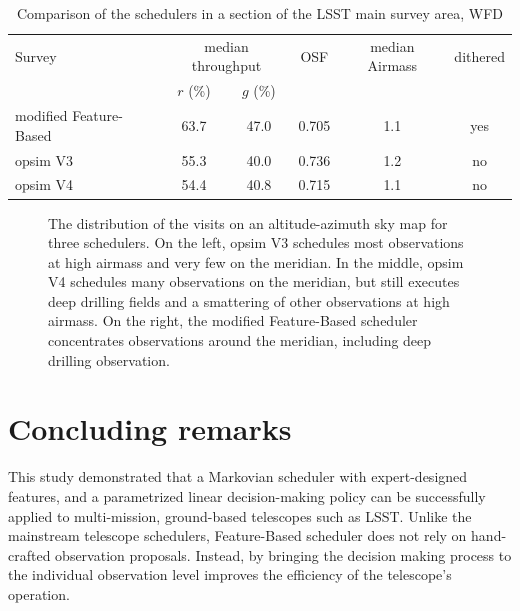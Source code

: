 \documentclass[12pt]{aastex62}
\theoremstyle{definition}
\begin{document}
\begin{table}
\caption{Comparison of the schedulers in a section of the LSST main survey area, WFD}\label{OSF_table}
\begin{center}
\begin{tabular}{l|ccccc} \hline
Survey &\multicolumn{2}{c}{median throughput} & OSF & median Airmass & dithered\\
&$r$ (\%) &  $g$ (\%) &&&\\ \hline
modified Feature-Based & 63.7 & 47.0& 0.705 & 1.1 & yes  \\
opsim V3      & 55.3 & 40.0 & 0.736 & 1.2 & no  \\
opsim V4      & 54.4 & 40.8 & 0.715 & 1.1 & no \\ \hline
\end{tabular}
\end{center}
\end{table}



\begin{figure}
\caption{The distribution of the visits on an altitude-azimuth sky map for three schedulers. On the left, opsim V3 schedules most observations at high airmass and very few on the meridian. In the middle, opsim V4 schedules many observations on the meridian, but still executes deep drilling fields and a smattering of other observations at high airmass. On the right, the modified Feature-Based scheduler concentrates observations around the meridian, including deep drilling observation. }\label{fig_all_alt_az}
\end{figure}

\section{Concluding remarks}\label{sec_conclusion}

This study demonstrated that a Markovian scheduler with expert-designed features, and a parametrized linear decision-making policy can be successfully applied to multi-mission, ground-based telescopes such as LSST. Unlike the mainstream telescope schedulers, Feature-Based scheduler does not rely on hand-crafted observation proposals. Instead, by bringing the decision making process to the individual observation level improves the efficiency of the telescope's operation. 
\end{document}
